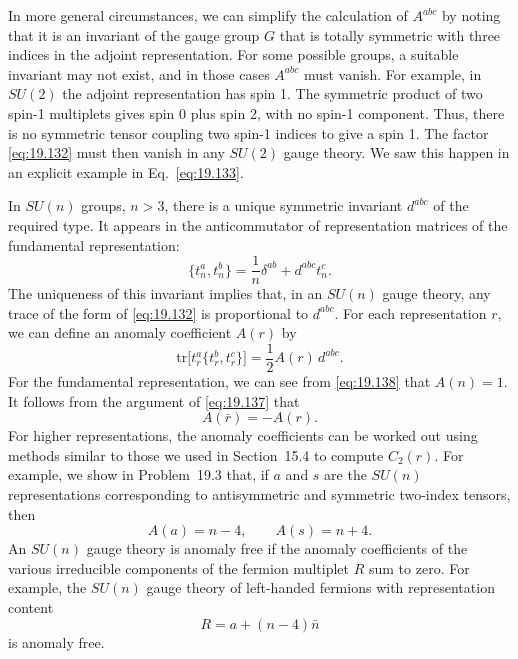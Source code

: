 In more general circumstances, we can simplify the calculation of $A^{abc}$
by noting that it is an invariant of the gauge group $G$ that is totally
symmetric with three indices in the adjoint representation.  For some
possible groups, a suitable invariant may not exist, and in those cases
$A^{abc}$ must vanish.  For example, in $SU(2)$ the adjoint representation has
spin 1.  The symmetric product of two spin-1 multiplets gives spin 0 plus
spin 2, with no spin-1 component.  Thus, there is no symmetric tensor
coupling two spin-1 indices to give a spin 1.  The factor \eqref{eq:19.132}
must then vanish in any $SU(2)$ gauge theory.  We saw this happen in an
explicit example in Eq.~\eqref{eq:19.133}.

In $SU(n)$ groups, $n > 3$, there is a unique symmetric invariant $d^{abc}$
of the required type.  It appears in the anticommutator of representation
matrices of the fundamental representation:
\begin{equation}
  \{ t^a_n, t^b_n \} = \frac{1}{n}\delta^{ab} + d^{abc}t^c_n .
  \label{eq:19.138}
\end{equation}
The uniqueness of this invariant implies that, in an $SU(n)$ gauge theory,
any trace of the form of \eqref{eq:19.132} is proportional to $d^{abc}$.
For each representation $r$, we can define an anomaly coefficient $A(r)$ by
\begin{equation}
  \mathrm{tr}\bigl[ t^a_r\{t^b_r, t^c_r\} \bigr] = \frac{1}{2}A(r)\,d^{abc}
  .
  \label{eq:19.139}
\end{equation}
For the fundamental representation, we can see from \eqref{eq:19.138} that
$A(n) = 1$.  It follows from the argument of \eqref{eq:19.137} that
\begin{equation}
  A(\bar{r}) = -A(r) .
  \label{eq:19.140}
\end{equation}
For higher representations, the anomaly coefficients can be worked out using
methods similar to those we used in Section~15.4 to compute $C_2(r)$.  For
example, we show in Problem~19.3 that, if $a$ and $s$ are the $SU(n)$
representations corresponding to antisymmetric and symmetric two-index
tensors, then
\begin{equation}
  A(a) = n - 4,\qquad A(s) = n + 4 .
  \label{eq:19.141}
\end{equation}
An $SU(n)$ gauge theory is anomaly free if the anomaly coefficients of the
various irreducible components of the fermion multiplet $R$ sum to zero.  For
example, the $SU(n)$ gauge theory of left-handed fermions with
representation content
\begin{equation}
  R = a + (n-4)\bar{n}
  \label{eq:19.142}
\end{equation}
is anomaly free.

